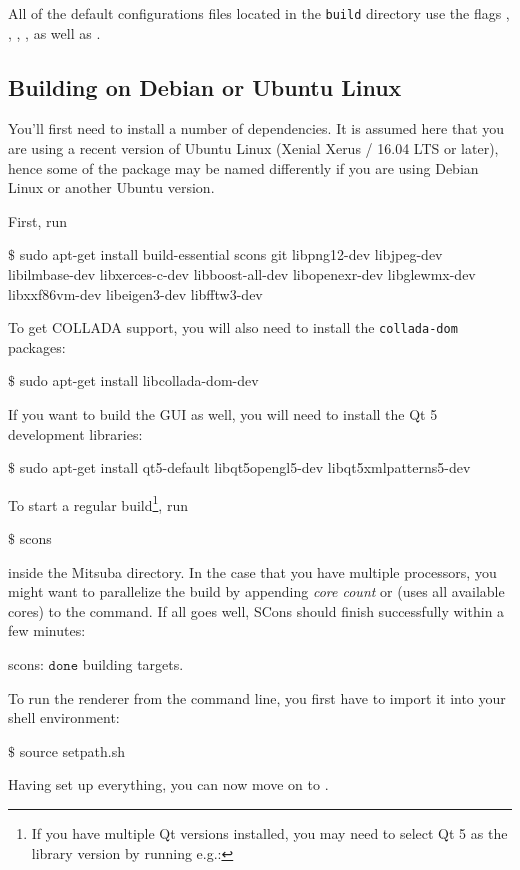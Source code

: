 All of the default configurations files located in the \texttt{build} directory use the flags
, , , ,
as well as .

\subsection{Building on Debian or Ubuntu Linux}
\label{sec:compiling-ubuntu}
You'll first need to install a number of dependencies. It is assumed here that you are using a
recent version of Ubuntu Linux (Xenial Xerus / 16.04 LTS or later), hence some of the
package may be named differently if you are using Debian Linux or another Ubuntu version.

First, run
\begin{shell}
$\text{\$}$ sudo apt-get install build-essential scons git libpng12-dev
    libjpeg-dev libilmbase-dev libxerces-c-dev libboost-all-dev libopenexr-dev
    libglewmx-dev libxxf86vm-dev libeigen3-dev libfftw3-dev
\end{shell}
To get COLLADA support, you will also need to install the \texttt{collada-dom} packages:
\begin{shell}
$\text{\$}$ sudo apt-get install libcollada-dom-dev
\end{shell}
If you want to build the GUI as well, you will need to install the Qt 5 development libraries:
\begin{shell}
$\text{\$}$ sudo apt-get install qt5-default libqt5opengl5-dev libqt5xmlpatterns5-dev
\end{shell}
To start a regular build\footnote{If you have multiple Qt versions installed, you may need to select Qt 5 as the library version by running e.g.:  }, run
\begin{shell}
$\text{\$}$ scons
\end{shell}
inside the Mitsuba directory. In the case that you have multiple processors, you might want to parallelize the
build by appending \emph{core count} or  (uses all available cores) to the  command.
If all goes well, SCons should finish successfully within a few minutes:
\begin{shell}
scons: $\texttt{done}$ building targets.
\end{shell}
To run the renderer from the command line, you first have to import it into your shell environment:
\begin{shell}
$\text{\$}$ source setpath.sh
\end{shell}
Having set up everything, you can now move on to .

